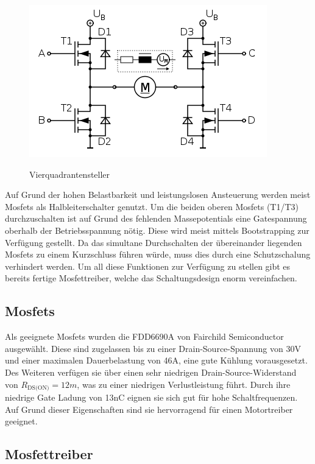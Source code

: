 \begin{figure}[H]
\centering
\includegraphics[width=.8\textwidth]{Vierquadrantensteller.png}\\
\caption{Vierquadrantensteller \cite{vierquadrantensteller}}%
\label{fig:Vierquadrantensteller}
\end{figure}


Auf Grund der hohen Belastbarkeit und leistungslosen Ansteuerung werden meist Mosfets als Halbleiterschalter genutzt. Um die beiden oberen Mosfets (T1/T3) durchzuschalten
ist auf Grund des fehlenden Massepotentials eine Gatespannung oberhalb der Betriebsspannung nötig. Diese wird meist mittels Bootstrapping zur
Verfügung gestellt. Da das simultane Durchschalten der übereinander liegenden Mosfets zu einem Kurzschluss führen würde, muss dies durch
eine Schutzschalung verhindert werden. Um all diese Funktionen zur Verfügung zu stellen gibt es bereits fertige Mosfettreiber,
welche das Schaltungsdesign enorm vereinfachen.


\subsection{Mosfets}
Als geeignete Mosfets wurden die FDD6690A von Fairchild Semiconductor ausgewählt. Diese sind zugelassen bis zu einer Drain-Source-Spannung von 30V und einer maximalen Dauerbelastung
von 46A, eine gute Kühlung vorausgesetzt. Des Weiteren verfügen sie über einen sehr niedrigen Drain-Source-Widerstand von $R_{\text{DS(ON)}}= 12 m$, was zu einer niedrigen Verlustleistung führt. Durch ihre niedrige 
Gate Ladung von 13nC eignen sie sich gut für hohe Schaltfrequenzen. Auf Grund dieser Eigenschaften sind sie hervorragend für einen Motortreiber geeignet.


\subsection{Mosfettreiber}
